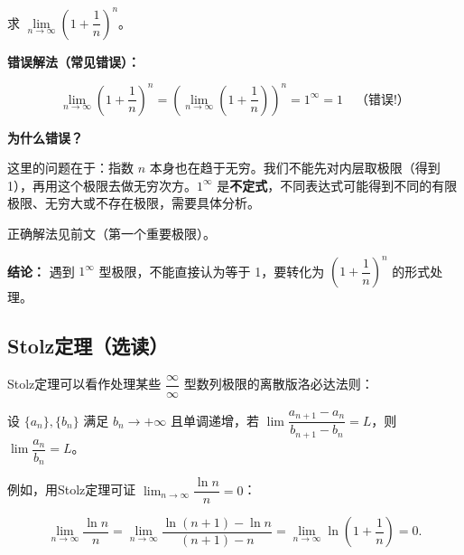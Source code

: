 \documentclass[fontset=fandol]{ctexart}
\newenvironment{extra}{\begin{mdframed}[style=extrastyle, frametitle={* 选读内容（不要求掌握）}]}{\end{mdframed}}
\begin{document}
\begin{example}[错误：拆分乘积中的无穷小量]

求 \(\lim\limits_{n\to\infty} \left(1 + \dfrac{1}{n}\right)^n\)。



\textbf{错误解法（常见错误）：}

\[

\lim_{n\to\infty} \left(1 + \dfrac{1}{n}\right)^n = \left(\lim_{n\to\infty} \left(1 + \dfrac{1}{n}\right)\right)^n = 1^\infty = 1 \quad \text{（错误!）}

\]



\textbf{为什么错误？}



这里的问题在于：指数 \(n\) 本身也在趋于无穷。我们不能先对内层取极限（得到 1），再用这个极限去做无穷次方。\(1^\infty\) 是\textbf{不定式}，不同表达式可能得到不同的有限极限、无穷大或不存在极限，需要具体分析。



正确解法见前文（第一个重要极限）。



\textbf{结论：} 遇到 \(1^\infty\) 型极限，不能直接认为等于 1，要转化为 \((1 + \dfrac{1}{n})^n\) 的形式处理。

\end{example}



\fi



\begin{extra}

\subsection*{Stolz定理（选读）}



Stolz定理可以看作处理某些 \(\dfrac{\infty}{\infty}\) 型数列极限的离散版洛必达法则：

设 \(\{a_n\}, \{b_n\}\) 满足 \(b_n \to +\infty\) 且单调递增，若 \(\lim \dfrac{a_{n+1}-a_n}{b_{n+1}-b_n} = L\)，则 \(\lim \dfrac{a_n}{b_n} = L\)。



例如，用Stolz定理可证 \(\lim_{n\to\infty} \dfrac{\ln n}{n} = 0\)：

\[

\lim_{n\to\infty} \dfrac{\ln n}{n} = \lim_{n\to\infty} \dfrac{\ln(n+1) - \ln n}{(n+1)-n} = \lim_{n\to\infty} \ln\left(1+\dfrac{1}{n}\right) = 0.

\]

\end{extra}
\end{document}
